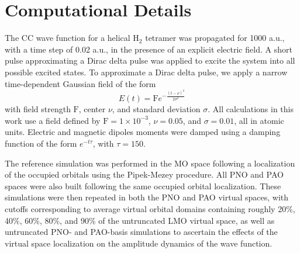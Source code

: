 \section{Computational Details} \label{se:comp}
The CC wave function for a helical H$_2$ tetramer was propagated
for 1000 a.u., with a time step of 0.02 a.u., in the presence of an explicit electric field. A short pulse
approximating a Dirac delta pulse was applied to excite
the system into all possible excited states. 
To approximate a Dirac delta pulse, we apply a narrow time-dependent Gaussian field 
of the form
\begin{equation}
    E(t) = \textrm{F}e^{-\frac{(t-\nu)^{2}}{2\sigma^2}}
\end{equation}
with field strength $\textrm{F}$, center $\nu$, and standard deviation $\sigma$.
All calculations in this work use a field defined by $\textrm{F} = 1\times 10^{-3}$,
$\nu = 0.05$, and $\sigma = 0.01$, all in atomic units. Electric and magnetic 
dipoles moments were damped using a damping function of the form $e^{-t\tau}$, 
with $\tau = 150$.

The reference simulation was performed in the MO space following a localization of the occupied
orbitals using the Pipek-Mezey procedure.\cite{Pipek1989} All PNO and PAO spaces were also 
built following the same occupied orbital localization. These simulations
were then repeated in both the PNO and PAO virtual spaces, with cutoffs
corresponding to average virtual orbital domains containing roughly 20\%, 40\%, 60\%,
80\%, and 90\% of the untruncated LMO virtual space, as well as untruncated PNO- and PAO-basis
simulations to ascertain the effects of the virtual space localization on
the amplitude dynamics of the wave function. 

